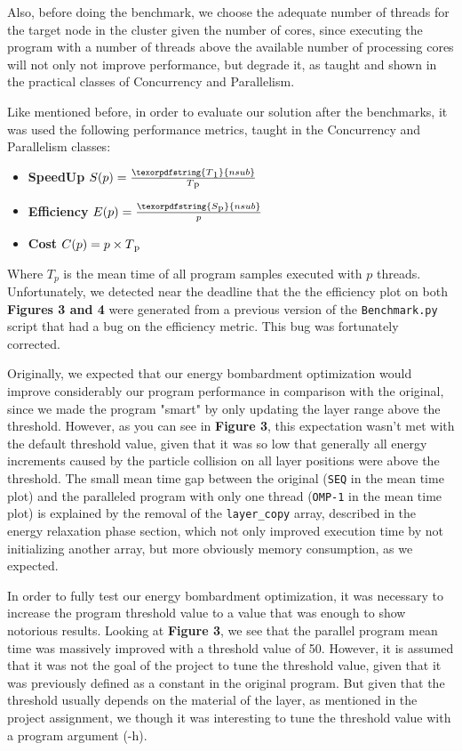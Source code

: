 \par Also, before doing the benchmark, we choose the adequate number of threads for the target node in the cluster given the number of cores, since executing the program with a number of threads above the available number of processing cores will not only not improve performance, but degrade it, as taught and shown in the practical classes of Concurrency and Parallelism.
\par Like mentioned before, in order to evaluate our solution after the benchmarks, it was used the following performance metrics, taught in the Concurrency and Parallelism classes:
\begin{itemize}
    \item \textbf{SpeedUp}
            \(S(p) = \frac{\texorpdfstring{T\textsubscript{1}}{nsub}}{T\textsubscript{p}}\)\\
    \item \textbf{Efficiency}
            \(E(p) = \frac{\texorpdfstring{S\textsubscript{p}}{nsub}}{p}\)\\
    \item \textbf{Cost}
            \(C(p) = p \times T\textsubscript{p}\)\\
\end{itemize}

Where \(T_{p}\) is the mean time of all program samples executed with \(p\) threads. Unfortunately, we detected near the deadline that the the efficiency plot on both \textbf{Figures 3 and 4} were generated from a previous version of the \verb|Benchmark.py| script that had a bug on the efficiency metric. This bug was fortunately corrected.

Originally, we expected that our energy bombardment optimization would improve considerably our program performance in comparison with the original, since we made the program "smart" by only updating the layer range above the threshold. However, as you can see in \textbf{Figure 3}, this expectation wasn't met with the default threshold value, given that it was so low that generally all energy increments caused by the particle collision on all layer positions were above the threshold. The small mean time gap between the original (\verb|SEQ| in the mean time plot) and the paralleled program with only one thread (\verb|OMP-1| in the mean time plot) is explained by the removal of the \verb|layer_copy| array, described in the energy relaxation phase section, which not only improved execution time by not initializing another array, but more obviously memory consumption, as we expected. 
\par In order to fully test our energy bombardment optimization, it was necessary to increase the program threshold value to a value that was enough to show notorious results. Looking at \textbf{Figure 3}, we see that the parallel program mean time was massively improved with a threshold value of 50. However, it is assumed that it was not the goal of the project to tune the threshold value, given that it was previously defined as a constant in the original program. But given that the threshold usually depends on the material of the layer, as mentioned in the project assignment, we though it was interesting to tune the threshold value with a program argument (-h).

